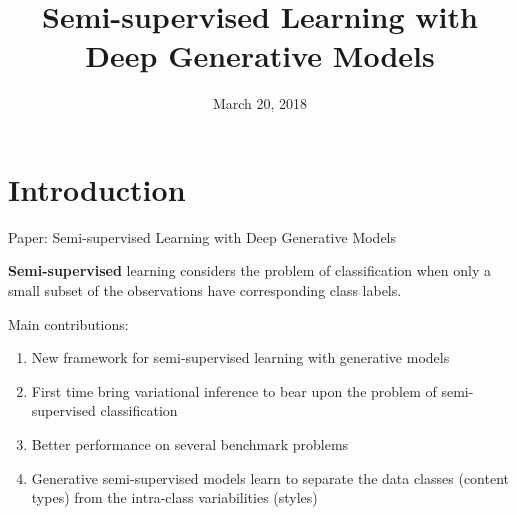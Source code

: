 \documentclass{beamer}
\title[latent]{Semi-supervised Learning with Deep Generative Models}
\author[Demi, Justin, Yuntian]{March 20, 2018}
\institute[Harvard SEAS]{ 
{ }


}
\date{}
\let\tempone\itemize
\let\temptwo\enditemize
\renewenvironment{itemize}{\tempone\addtolength{\itemsep}{0.5\baselineskip}}{\temptwo}
\begin{document}
\begin{frame}
  \titlepage
\end{frame}

\begin{frame}
  \tableofcontents
\end{frame}

\section{Introduction}
\begin{frame}
  \begin{center}
    \begin{itemize}
      \item Paper: Semi-supervised Learning with Deep Generative Models
      \item \textbf{Semi-supervised} learning considers the problem of classification when only a small subset of the 
      observations have corresponding class labels.
      \item Main contributions:
        \begin{enumerate}
          \item New framework for semi-supervised learning with generative models
          \item First time bring variational inference to bear upon the problem of semi-supervised classification
          \item Better performance on several benchmark problems
          \item Generative semi-supervised models learn to separate the data classes (content types) from the intra-class variabilities (styles)
        \end{enumerate}
      \end{itemize}
   \end{center} 
\end{frame}
\end{document}
